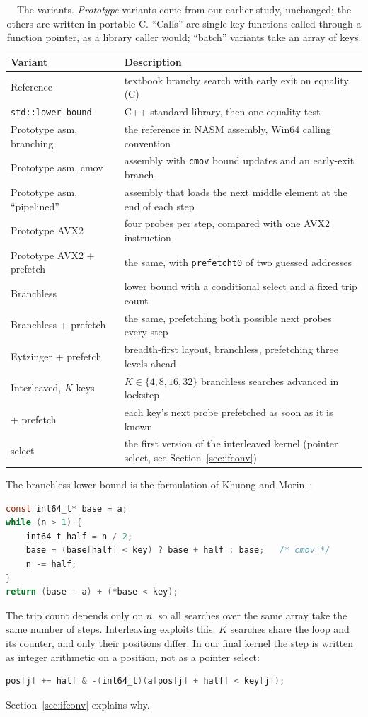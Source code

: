 \documentclass[11pt]{article}
\begin{document}
\begin{table}[t]
\centering
\caption{The variants. \emph{Prototype} variants come from our earlier
study, unchanged; the others are written in portable C. ``Calls'' are
single-key functions called through a function pointer, as a library caller
would; ``batch'' variants take an array of keys.}
\label{tab:variants}
\small
\begin{tabular}{lp{10.2cm}}
\toprule
Variant & Description\\
\midrule
Reference & textbook branchy search with early exit on equality (C)\\
\texttt{std::lower\_bound} & C++ standard library, then one equality test\\
Prototype asm, branching & the reference in NASM assembly, Win64 calling convention\\
Prototype asm, cmov & assembly with \texttt{cmov} bound updates and an early-exit branch\\
Prototype asm, ``pipelined'' & assembly that loads the next middle element at the end of each step\\
Prototype AVX2 & four probes per step, compared with one AVX2 instruction\\
Prototype AVX2 + prefetch & the same, with \texttt{prefetcht0} of two guessed addresses\\
Branchless & lower bound with a conditional select and a fixed trip count~\cite{khuong2017layouts}\\
Branchless + prefetch & the same, prefetching both possible next probes every step\\
Eytzinger + prefetch & breadth-first layout, branchless, prefetching three levels ahead~\cite{khuong2017layouts}\\
Interleaved, $K$ keys & $K \in \{4,8,16,32\}$ branchless searches advanced in lockstep\\
\quad + prefetch & each key's next probe prefetched as soon as it is known\\
\quad select & the first version of the interleaved kernel (pointer select, see Section~\ref{sec:ifconv})\\
\bottomrule
\end{tabular}
\end{table}

The branchless lower bound is the formulation of Khuong and
Morin~\cite{khuong2017layouts}:
\begin{lstlisting}[language=C]
const int64_t* base = a;
while (n > 1) {
    int64_t half = n / 2;
    base = (base[half] < key) ? base + half : base;   /* cmov */
    n -= half;
}
return (base - a) + (*base < key);
\end{lstlisting}
The trip count depends only on $n$, so all searches over the same array take
the same number of steps. Interleaving exploits this: $K$ searches share the
loop and its counter, and only their positions differ. In our final kernel the
step is written as integer arithmetic on a position, not as a pointer select:
\begin{lstlisting}[language=C]
pos[j] += half & -(int64_t)(a[pos[j] + half] < key[j]);
\end{lstlisting}
Section~\ref{sec:ifconv} explains why.
\end{document}
